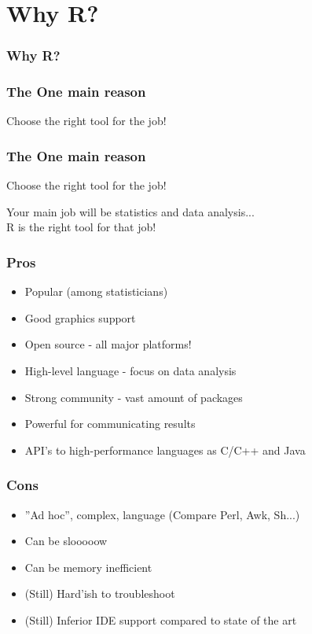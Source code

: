 \documentclass{beamer}
\begin{document}
\section{Why R?}

\begin{frame}
	\frametitle{Why R?}
\end{frame}

\begin{frame}
	\frametitle{The One main reason}
	\Huge{\centerline{Choose the right tool for the job!}}
\end{frame}

\begin{frame}
	\frametitle{The One main reason}
	\Huge{\centerline{Choose the right tool for the job!}}
	\Huge{\centerline{ }}
	\large{Your main job will be statistics and data analysis... \\
		 R is the right tool for that job!}
\end{frame}

\begin{frame}
	\frametitle{Pros}
	\begin{itemize}
		\item Popular (among statisticians)
		\item Good graphics support
		\item Open source - all major platforms!
		\item High-level language - focus on data analysis
		\item Strong community - vast amount of packages
		\item Powerful for communicating results
		\item API's to high-performance languages as C/C++ and Java
	\end{itemize}
\end{frame}

\begin{frame}
	\frametitle{Cons}
	\begin{itemize}
		\item ''Ad hoc'', complex, language (Compare Perl, Awk, Sh...)
		\item Can be slooooow
		\item Can be memory inefficient
		\item (Still) Hard'ish to troubleshoot
		\item (Still) Inferior IDE support compared to state of the art
	\end{itemize}
\end{frame}
\end{document}
